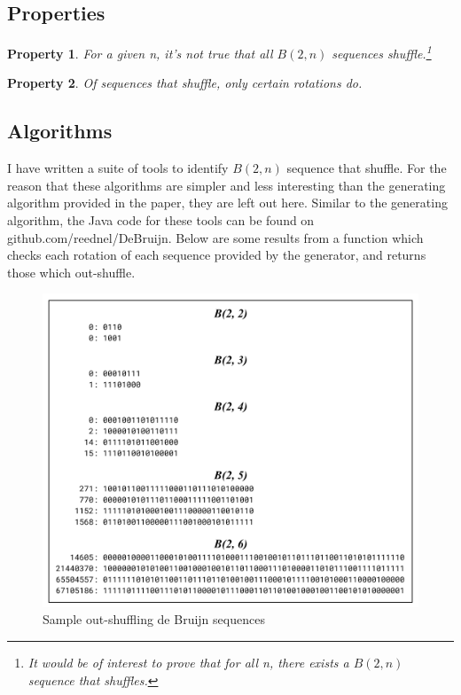 \documentclass[12pt]{article}
\newtheorem{property}{Property}[section]
\begin{document}
\subsection{Properties}
\begin{property}
\normalfont For a given n, it’s not true that all $B(2,n)$ sequences shuffle.\footnote{It would be of interest to prove that for all n, there exists a $B(2,n)$ sequence that shuffles.}
\end{property}

\begin{property}
\normalfont Of sequences that shuffle, only certain rotations do. 
\end{property}

\subsection{Algorithms}
I have written a suite of tools to identify $B(2,n)$ sequence that shuffle. For the reason that these algorithms are simpler and less interesting than the generating algorithm provided in the paper, they are left out here. Similar to the generating algorithm, the Java code for these tools can be found on github.com/reednel/DeBruijn. Below are some results from a function which checks each rotation of each sequence provided by the generator, and returns those which out-shuffle.

\begin{figure}[ht!]
\centering
\includegraphics[scale=0.7]{graphics/b_outshuffles.png}
\caption{Sample out-shuffling de Bruijn sequences}
\label{}
\end{figure}
\end{document}
